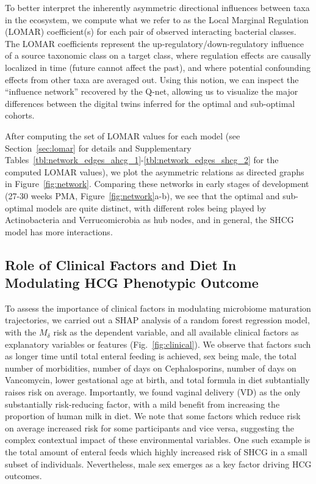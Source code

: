 \documentclass[onecolumn,10pt]{IEEEtran}
\def\qnet{Q-net\xspace}
\def\erisk{$M_\delta$\xspace}
\def\actn{Actinobacteria\xspace}
\def\verru{Verrucomicrobia\xspace}
\def\EXTENDEDDATA{Supplementary\xspace}
\begin{document}
 To better interpret the inherently asymmetric directional influences between taxa in the ecosystem, we  compute what we refer to as the Local Marginal Regulation (LOMAR) coefficient(s) for each pair of observed interacting bacterial classes. The LOMAR coefficients represent the up-regulatory/down-regulatory influence of a source taxonomic class on a target class, where regulation effects are causally localized in time (future cannot affect the past), and where potential confounding effects from other taxa are averaged out. Using this notion, we can inspect   the ``influence network''  recovered by the \qnet, allowing us to visualize the major differences between the digital twins inferred for the optimal and sub-optimal cohorts.

   After computing the set of LOMAR values for each model (see Section~\ref{sec:lomar} for details and \EXTENDEDDATA  Tables~\ref{tbl:network_edges_ahcg_1}-\ref{tbl:network_edges_shcg_2} for the computed LOMAR values), we plot the asymmetric relations as  directed graphs in Figure~\ref{fig:network}.  Comparing these networks in early stages of development (27-30 weeks PMA, Figure~\ref{fig:network}a-b), we see that the optimal and sub-optimal models are quite distinct, with different roles being played by \actn and \verru as hub nodes, and in general, the SHCG model has more interactions.

\subsection*{Role of Clinical Factors and  Diet In Modulating HCG Phenotypic Outcome}

To assess the importance of  clinical factors in modulating microbiome maturation trajectories, we carried out a SHAP analysis of a random forest regression model, with the \erisk risk as the dependent variable, and  all  available clinical factors as explanatory variables or features (Fig.~\ref{fig:clinical}).  We observe that factors such as longer time until total enteral feeding is achieved, sex being male,  the total number of morbidities, number of days on Cephalosporins, number of days on Vancomycin, lower gestational age at birth, and total formula in diet subtantially raises risk on average. Importantly, we found  vaginal  delivery (VD) as the only substantially risk-reducing factor, with a mild benefit from increasing the proportion of human milk in diet. We note that some factors which reduce risk on average increased risk for some participants and vice versa, suggesting the complex contextual impact of these environmental variables. One such example is the total amount of enteral feeds which highly increased risk of SHCG in a small subset of individuals. Nevertheless, male sex emerges as a key factor driving HCG outcomes.
\end{document}
